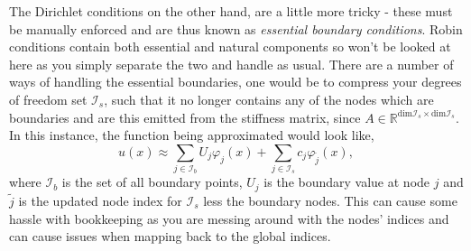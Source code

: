 The Dirichlet conditions on the other hand, are a little more tricky - these must be manually enforced and are thus known as \textit{essential boundary conditions}. Robin conditions contain both essential and natural components so won't be looked at here as you simply separate the two and handle as usual. There are a number of ways of handling the essential boundaries, one would be to compress your degrees of freedom set $\mathcal{I}_s$, such that it no longer contains any of the nodes which are boundaries and are this emitted from the stiffness matrix, since $A \in \mathbb{R}^{\text{dim} \mathcal{I}_s \times \text{dim}\mathcal{I}_s}$. In this instance, the function being approximated would look like,
\begin{equation}
	u(x) \approx \sum_{j\in\mathcal{I}_b}U_j\varphi_j(x) + \sum_{j\in\mathcal{I}_s}c_j\varphi_{\tilde j}(x),
\end{equation}
where $\mathcal{I}_b$ is the set of all boundary points, $U_j$ is the boundary value at node $j$ and $\tilde{j}$ is the updated node index for $\mathcal{I}_s$ less the boundary nodes. This can cause some hassle with bookkeeping as you are messing around with the nodes' indices and can cause issues when mapping back to the global indices.

